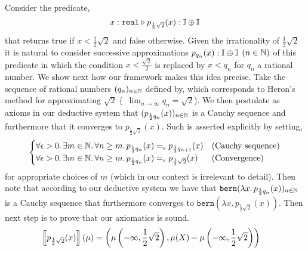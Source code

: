 \documentclass[a4paper,UKenglish,cleveref, autoref, thm-restate]{lipics-v2021}
\begin{document}
\begin{example}
        Consider the predicate,
        \[
                x : \mathtt{real} \triangleright
                p_{\frac{1}{2}\sqrt{2}}(x) : \mathbb{I} \oplus \mathbb{I}
        \]
        that returns true if $x < \frac{1}{2}\sqrt{2}$ and false otherwise.
        Given the irrationality of $\frac{1}{2}\sqrt{2}$ it is natural to
        consider successive approximations $p_{q_n}(x) :  \mathbb{I} \oplus \mathbb{I}$
        $(n \in \mathbb{N})$ of this predicate in which the condition $x <
        \frac{\sqrt{2}}{2}$ is replaced by $x < q_n$ for $q_n$ a rational
        number. We show next how our framework makes this idea precise. Take
        the sequence of rational numbers $(q_n)_{n \in \mathbb{N}}$ defined by,
       which corresponds to Heron's method for approximating $\sqrt{2}$ (\ie\
        $\lim_{n \to \infty} q_n = \sqrt{2}$). We then postulate as axioms in
        our deductive system that $(p_{\frac{1}{2} q_n}(x))_{n \in \mathbb{N}}$ is a
        Cauchy sequence and furthermore that it converges to $p_{\frac{1}{2}
        \sqrt{2}}(x)$.  Such is asserted explicitly by setting,
        \begin{equation}
                \label{eq:sound}
                \begin{cases}
                \forall \epsilon > 0. \, \exists m \in \mathbb{N}.
                \, \forall n \geq m. \, p_{\frac{1}{2}q_n}(x) =_\epsilon p_{\frac{1}{2}q_{n+1}} (x)
                & \text{(Cauchy sequence)}
                \\
                \forall \epsilon > 0. \, \exists m \in \mathbb{N}.
                \, \forall n \geq m. \, p_{\frac{1}{2}q_n}(x) 
                =_\epsilon p_{\frac{1}{2} \sqrt{2}} (x)
                & \text{(Convergence)}
                \end{cases}
        \end{equation}
        for appropriate choices of $m$ (which in our context is irrelevant to
        detail). Then note that according to our deductive system we have that
        $\mathtt{bern}(\lambda x. \, p_{\frac{1}{2} q_n}(x))_{n \in \mathbb{N}}$ is
        a Cauchy sequence that furthermore converges to $\mathtt{bern}(\lambda
        x. \, p_{\frac{1}{2} \sqrt{2}}(x))$. Then next step is to prove
        that our axiomatics is sound.
        \begin{align*}
                \sem{p_{\frac{1}{2} \sqrt{2}}(x)}(\mu)
                & = \left (\mu \left (-\infty, \frac{1}{2} \sqrt{2} \right ), 
                \mu(X) - \mu \left (-\infty, \frac{1}{2}\sqrt{2} \right ) \right )

\end{align*}
\end{example}
\end{document}
